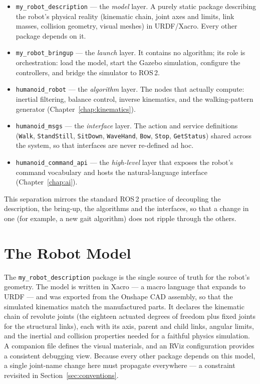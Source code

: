 \begin{itemize}[itemsep=3pt,topsep=4pt]
  \item \texttt{my\_robot\_description} --- the \emph{model} layer. A purely
        static package describing the robot's physical reality (kinematic
        chain, joint axes and limits, link masses, collision geometry,
        visual meshes) in URDF/Xacro. Every other package depends on it.
  \item \texttt{my\_robot\_bringup} --- the \emph{launch} layer. It contains
        no algorithm; its role is orchestration: load the model, start the
        Gazebo simulation, configure the controllers, and bridge the
        simulator to ROS\,2.
  \item \texttt{humanoid\_robot} --- the \emph{algorithm} layer. The nodes
        that actually compute: inertial filtering, balance control, inverse
        kinematics, and the walking-pattern generator
        (Chapter~\ref{chap:kinematics}).
  \item \texttt{humanoid\_msgs} --- the \emph{interface} layer. The action
        and service definitions (\texttt{Walk}, \texttt{StandStill},
        \texttt{SitDown}, \texttt{WaveHand}, \texttt{Bow}, \texttt{Stop},
        \texttt{GetStatus}) shared across the system, so that interfaces are
        never re-defined ad hoc.
  \item \texttt{humanoid\_command\_api} --- the \emph{high-level} layer that
        exposes the robot's command vocabulary and hosts the
        natural-language interface (Chapter~\ref{chap:ai}).
\end{itemize}

This separation mirrors the standard ROS\,2 practice of decoupling the
description, the bring-up, the algorithms and the interfaces, so that a
change in one (for example, a new gait algorithm) does not ripple through
the others.

\section{The Robot Model}
\label{sec:model}
The \texttt{my\_robot\_description} package is the single source of truth
for the robot's geometry. The model is written in Xacro --- a macro
language that expands to URDF --- and was exported from the Onshape CAD
assembly, so that the simulated kinematics match the manufactured parts.
It declares the kinematic chain of revolute joints (the eighteen actuated
degrees of freedom plus fixed joints for the structural links), each with
its axis, parent and child links, angular limits, and the inertial and
collision properties needed for a faithful physics simulation. A
companion file defines the visual materials, and an RViz configuration
provides a consistent debugging view. Because every other package depends
on this model, a single joint-name change here must propagate everywhere
--- a constraint revisited in Section~\ref{sec:conventions}.

